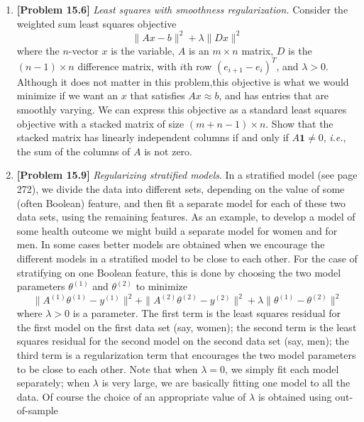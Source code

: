 \begin{enumerate}[label=(\alph*)]
	\item \textbf{[Problem 15.6]} \textit{Least squares with smoothness
		      regularization.} Consider the weighted sum least squares objective
	      $$ \parallel Ax - b \parallel^2 + \lambda \parallel Dx \parallel^2$$
	      where the $n$-vector $x$ is the variable, $A$ is an $m \times n$
	      matrix, $D$ is the $(n - 1) \times n$ difference matrix, with $i$th
	      row $(e_{i + 1} - e_i)^T$, and $\lambda > 0$. Although it does not
	      matter in this problem,this objective is what we would minimize if we
	      want an $x$ that satisfies $Ax \approx b$, and has entries that are
	      smoothly varying. We can express this objective as a standard least
	      squares objective with a stacked matrix  of size $(m + n - 1) \times
		      n$.
	      Show that the stacked matrix has linearly independent columns if and
	      only if $A \mathbf{1} \neq 0$, \textit{i.e.}, the sum of the columns
	      of $A$ is not zero.
	\item \textbf{[Problem 15.9]} \textit{Regularizing stratified models}. In a
	      stratified model (see page 272), we divide the data into different sets,
	      depending on the value of some (often Boolean) feature, and then fit a
	      separate model for each of these two data sets, using the remaining
	      features. As an example, to develop a model of some health outcome we
	      might build a separate model for women and for men. In some cases better
	      models are obtained when we encourage the different models in a
	      stratified model to be close to each other. For the case of stratifying
	      on one Boolean feature, this is done by choosing the two model
	      parameters $\theta^{(1)}$ and $\theta^{(2)}$ to minimize
	      $$ \parallel A^{(1)} \theta^{(1)} - y^{(1)} \parallel^2 + \parallel
		      A^{(2)} \theta^{(2)} - y^{(2)} \parallel^2 + \lambda \parallel
		      \theta^{(1)} - \theta^{(2)} \parallel^2 $$
	      where $\lambda > 0$ is a parameter. The first term is the least
	      squares residual for the first model on the first data set (say,
	      women); the second term is the least squares residual for the second
	      model on the second data set (say, men); the third term is a
	      regularization term that encourages the two model parameters to be
	      close to each other. Note that when $\lambda = 0$, we simply fit each
	      model separately; when $\lambda$ is very large, we are basically
	      fitting one model to all the data. Of course the choice of an
	      appropriate value of $\lambda$ is obtained using out-of-sample

\end{enumerate}
